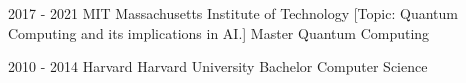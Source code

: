     \begin{sidesection}
   
        \education
            {2017 - 2021}
            {MIT}
            {Massachusetts Institute of Technology}
            [Topic: Quantum Computing and its implications in AI.]
            {Master}
            {Quantum Computing}

    \vspace{1.4ex}

        \education
            {2010 - 2014}
            {Harvard}
            {Harvard University}
            {Bachelor}
            {Computer Science}

    \end{sidesection}